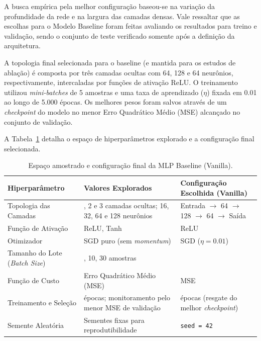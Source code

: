 \documentclass[11pt,a4paper]{article}
\begin{document}
A busca empírica pela melhor configuração baseou-se na variação da profundidade da rede e na largura das camadas densas. Vale ressaltar que as escolhas para o Modelo Baseline foram feitas avaliando os resultados para treino e validação, sendo o conjunto de teste verificado somente após a definição da arquitetura.

A topologia final selecionada para o baseline (e mantida para os estudos de ablação) é composta por três camadas ocultas com 64, 128 e 64 neurônios, respectivamente, intercaladas por funções de ativação ReLU. O treinamento utilizou \textit{mini-batches} de 5 amostras e uma taxa de aprendizado ($\eta$) fixada em 0.01 ao longo de 5.000 épocas. Os melhores pesos foram salvos através de um \textit{checkpoint} do modelo no menor Erro Quadrático Médio (MSE) alcançado no conjunto de validação.

A Tabela~\ref{tab:baseline_hiper} detalha o espaço de hiperparâmetros explorado e a configuração final selecionada.

\begin{table}[h]
\centering
\small
\caption{Espaço amostrado e configuração final da MLP Baseline (Vanilla).}
\label{tab:baseline_hiper}
\begin{tabularx}{\textwidth}{
    >{\raggedright\arraybackslash}p{} 
    >{\raggedright\arraybackslash}X 
    >{\raggedright\arraybackslash}p{}
}
\toprule
\textbf{Hiperparâmetro} & \textbf{Valores Explorados} & \textbf{Configuração Escolhida (Vanilla)} \\
\midrule
Topologia das Camadas & 1, 2 e 3 camadas ocultas; 16, 32, 64 e 128 neurônios & Entrada $\rightarrow$ 64 $\rightarrow$ 128 $\rightarrow$ 64 $\rightarrow$ Saída \\
\addlinespace
Função de Ativação & ReLU, Tanh & ReLU \\
\addlinespace
Otimizador & SGD puro (sem \textit{momentum}) & SGD ($\eta = 0.01$) \\
\addlinespace
Tamanho do Lote (\textit{Batch Size}) & 5, 10, 30 amostras & 5 \\
\addlinespace
Função de Custo & Erro Quadrático Médio (MSE) & MSE  \\
\addlinespace
Treinamento e Seleção & 5.000 épocas; monitoramento pelo menor MSE de validação & 5.000 épocas (resgate do melhor \textit{checkpoint}) \\
\addlinespace
Semente Aleatória & Sementes fixas para reprodutibilidade & \texttt{seed = 42} \\
\bottomrule
\end{tabularx}
\end{table}
\vspace{1em}
\end{document}
